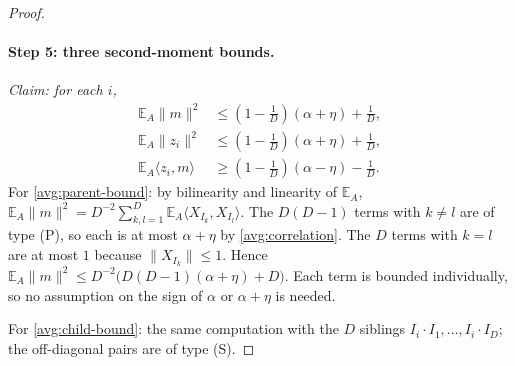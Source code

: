 \documentclass[11pt]{article}
\newcommand{\norm}[1]{\lVert #1\rVert}
\newcommand{\ip}[2]{\langle #1,#2\rangle}
\theoremstyle{definition}
\numberwithin{equation}{section}
\begin{document}
\begin{proof}
\paragraph{Step 5: three second-moment bounds.}
\emph{Claim: for each \(i\),}
\begin{align}
  \mathbb E_A\norm{m}^2
       &\leq\left(1-\frac1D\right)(\alpha+\eta)+\frac1D,
       \label{avg:parent-bound}\\
  \mathbb E_A\norm{z_i}^2
       &\leq\left(1-\frac1D\right)(\alpha+\eta)+\frac1D,
       \label{avg:child-bound}\\
  \mathbb E_A\ip{z_i}{m}
    &\geq\left(1-\frac1D\right)(\alpha-\eta)-\frac1D.
       \label{avg:mixed-bound}
\end{align}
For \eqref{avg:parent-bound}: by bilinearity and linearity of
\(\mathbb E_A\),
\(\mathbb E_A\norm{m}^2=D^{-2}\sum_{k,l=1}^D\mathbb E_A\ip{X_{I_k}}{X_{I_l}}\).
The \(D(D-1)\) terms with \(k\ne l\) are of type (P), so each is at most
\(\alpha+\eta\) by \eqref{avg:correlation}. The \(D\) terms with \(k=l\) are
at most \(1\) because \(\norm{X_{I_k}}\le1\). Hence
\(\mathbb E_A\norm{m}^2\le D^{-2}\bigl(D(D-1)(\alpha+\eta)+D\bigr)\). Each
term is bounded individually, so no assumption on the sign of \(\alpha\) or
\(\alpha+\eta\) is needed.

For \eqref{avg:child-bound}: the same computation with the \(D\) siblings
\(I_i\cdot I_1,\dots,I_i\cdot I_D\); the off-diagonal pairs are of type (S).


\end{proof}
\end{document}
